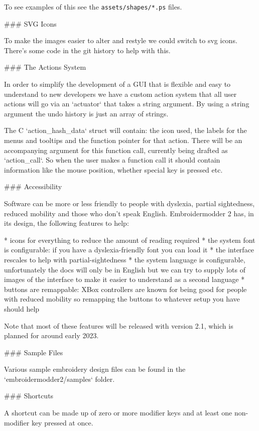 To see examples of this see the \texttt{assets/shapes/*.ps} files.

### SVG Icons

To make the images easier to alter and restyle we could switch to svg icons.
There's some code in the git history to help with this.

### The Actions System

In order to simplify the development of a GUI that is flexible and easy to
understand to new developers we have a custom action system that all user
actions will go via an `actuator` that takes a string argument. By using a
string argument the undo history is just an array of strings.

The C `action\_hash\_data` struct will contain: the icon used, the
labels for the menus and tooltips and the function pointer for that action.
There will be an accompanying argument for this function call, currently being
drafted as `action\_call`. So when the user makes a function call it should
contain information like the mouse position, whether special key is pressed etc.

### Accessibility

Software can be more or less friendly to people with dyslexia, partial
sightedness, reduced mobility and those who don't speak English. Embroidermodder
2 has, in its design, the following features to help:

* icons for everything to reduce the amount of reading required
* the system font is configurable: if you have a dyslexia-friendly font you can load it
* the interface rescales to help with partial-sightedness
* the system language is configurable, unfortunately the docs will only be in English but we can try to supply lots of images of the interface to make it easier to understand as a second language
* buttons are remappable: XBox controllers are known for being good for people with reduced mobility so remapping the buttons to whatever setup you have should help

Note that most of these features will be released with version 2.1, which is planned for around
early 2023.

### Sample Files

Various sample embroidery design files can be found in the
`embroidermodder2/samples` folder.

### Shortcuts

A shortcut can be made up of zero or more modifier keys and at least one non-modifier key
pressed at once.

